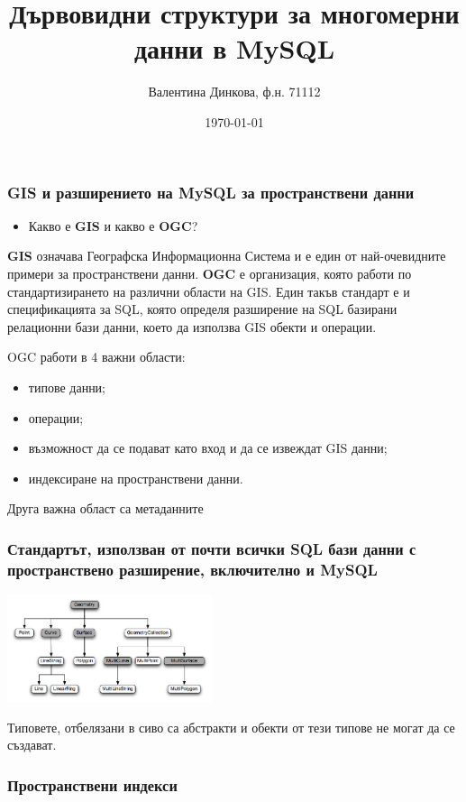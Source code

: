 \documentclass{beamer}
\title[Дървовидни структури за многомерни данни в MySQL]{Дървовидни структури за многомерни данни в MySQL}
\author{Валентина Динкова, ф.н. 71112}
\institute{ФМИ}
\date{\today}
\begin{document}
\begin{frame}
  \titlepage
\end{frame}

\begin{frame}
  \frametitle{GIS и разширението на MySQL за пространствени данни}
\begin{itemize}
 \item Какво е \textbf{GIS} и какво е \textbf{OGC}?
\end{itemize}
\textbf{GIS} означава Географска Информационна Система и е един от най-очевидните примери за пространствени данни.
\newline
\newline
\textbf{OGC} е организация, която работи по стандартизирането на различни области на GIS.
Един такъв стандарт е и спецификацията за SQL, която определя разширение на SQL базирани релационни бази данни, което да използва GIS обекти и операции.
\end{frame}

\begin{frame}
 OGC работи в 4 важни области:
\begin{itemize}
 \item типове данни;
 \item операции;
 \item възможност да се подават като вход и да се извеждат GIS данни;
 \item индексиране на пространствени данни.
\end{itemize}
Друга важна област са метаданните
\end{frame}

\begin{frame}
\frametitle{Стандартът, използван от почти всички SQL бази данни с пространствено разширение, включително и MySQL}
\begin{center}
\includegraphics[width=60mm]{gis-datatypes.png}\end{center}
Типовете, отбелязани в сиво са абстракти и обекти от тези типове не могат да се създават.
\end{frame}

\begin{frame}
 \frametitle{Пространствени индекси}
\end{frame}
\end{document}

